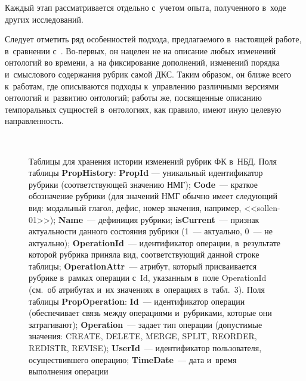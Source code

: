 \begin{multicols}{2}
 Каждый этап 
рассматривается отдельно с~учетом опыта, полученного в~ходе других 
исследований.

Следует отметить ряд особенностей подхода, предлагаемого в~настоящей 
работе, в~сравнении с~\cite{12-gon, 13-gon, 14-gon, 15-gon, 16-gon}.  
Во-пер\-вых, он нацелен не на описание любых изменений онтологий во 
времени, а~на фиксирование дополнений, изменений порядка и~смыслового 
содержания рубрик самой ДКС. Таким образом, он ближе всего к~работам, 
где описываются подходы к~управлению различными версиями онтологий 
и~развитию онтологий; работы же, посвященные описанию темпоральных 
сущностей в~онтологиях, как правило, имеют иную целевую направленность.

\begin{figure*}[b] %
\vspace*{1pt}
\begin{center}
\mbox{%
\epsfxsize=88mm
}
\end{center}

\vspace*{3pt}

\noindent
{\small %
{Таблицы для хранения истории изменений рубрик ФК в~НБД.}
%
%
Поля таблицы \textbf{PropHistory}: %
\textbf{PropId} --- уникальный идентификатор рубрики (соответствующей значению НМГ);
\textbf{Code}~--- краткое обозначение рубрики (для значений НМГ обычно имеет следующий вид: 
модальный глагол, дефис, номер значения, например, <<sollen-01>>);
\textbf{Name}~--- дефиниция рубрики;
\textbf{isCurrent}~--- признак актуальности данного состояния рубрики (1~--- актуально, 0~--- не 
актуально);
\textbf{OperationId}~--- идентификатор операции, в~результате которой рубрика приняла вид, 
соответствующий данной строке таблицы;
\textbf{OperationAttr}~--- атрибут, который присваивается рубрике в~рамках операции с~Id, 
указанным в~поле OperationId (см.\ об атрибутах и~их значениях в~операциях в~табл.~3).
Поля таблицы \textbf{PropOperation}:
\textbf{Id}~--- идентификатор операции (обеспечивает связь между операциями и~рубриками, 
которые они затрагивают);
\textbf{Operation}~--- задает тип операции (допустимые значения: CREATE, DELETE, MERGE, 
SPLIT, REORDER, REDISTR, REVISE);
\textbf{UserId}~--- идентификатор пользователя, осуществившего операцию;
\textbf{TimeDate}~--- дата и~время выполнения операции
}
\end{figure*}


\end{multicols}
